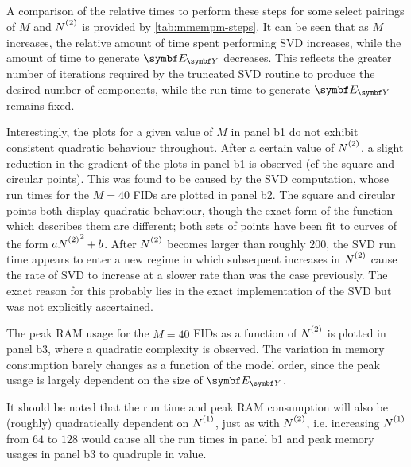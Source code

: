 A comparison of the relative times to perform these steps for some select
pairings of $M$ and $\Ntwo$ is provided by \cref{tab:mmempm-steps}. It can be
seen that as $M$ increases, the relative amount of time spent performing
\ac{SVD} increases, while the amount of time to generate $\EY$ decreases. This
reflects the greater number of iterations required by
the truncated \ac{SVD} routine\cite{svds} to produce the desired number of
components, while the run time to generate $\EY$ remains fixed.

Interestingly, the plots for a given value of $M$ in panel b1 do not exhibit
consistent quadratic behaviour throughout. After a certain value of $\Ntwo$, a
slight reduction in the gradient of the plots in panel b1 is observed (cf
the square and circular points). This was found to be caused by the \ac{SVD}
computation, whose run times for the $M=40$ \acp{FID} are plotted in panel b2.
The square and circular points both display quadratic behaviour, though the
exact form of the function which
describes them are different; both sets of points have been fit to curves of
the form $a\Ntwo^2 + b$. After $\Ntwo$ becomes larger than
roughly $200$, the \ac{SVD} run time appears to enter a new regime in which
subsequent increases in  $\Ntwo$ cause the rate of \ac{SVD} to increase at a
slower rate than was the case previously. The exact reason for this probably
lies in the exact implementation of the \ac{SVD} but was not explicitly
ascertained.

The peak \ac{RAM} usage for the $M=40$ \acp{FID} as a function of $\Ntwo$ is
plotted in panel b3, where a quadratic complexity is observed. The variation in
memory consumption barely changes as a function of the model order, since the
peak usage is largely dependent on the size of $\EY$.

It should be noted that the run time and peak \ac{RAM} consumption will also be
(roughly) quadratically dependent on $\None$, just as with $\Ntwo$, i.e.
increasing  $\None$ from  $64$ to $128$ would cause all the run times in panel
b1 and peak memory usages in panel b3 to quadruple in value.

